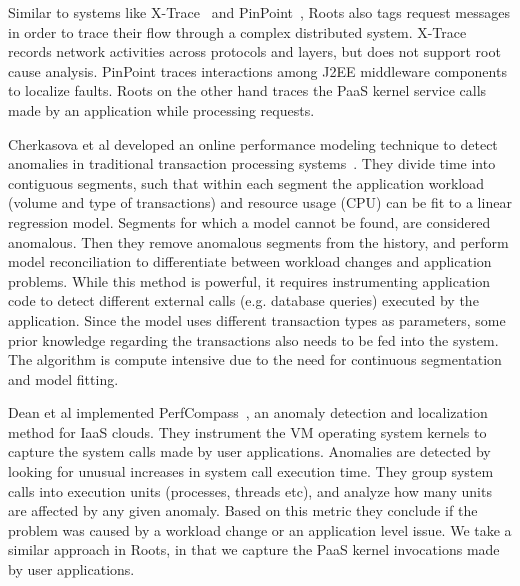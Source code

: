 Similar to systems like X-Trace~\cite{Fonseca:2007:XPN:1973430.1973450} and 
PinPoint~\cite{Chen:2002:PPD:647883.738238}, Roots also tags request messages in
order to trace their flow through a complex distributed system.
X-Trace records network activities across protocols and layers, but
does not support root cause analysis. PinPoint traces
interactions among J2EE middleware components to localize faults. Roots on the other
hand traces the PaaS kernel service calls made by an application while
processing requests.

Cherkasova et al developed an online
performance modeling technique to detect anomalies in traditional transaction processing systems~\cite{4630116}. 
They divide time into contiguous segments, such that within each
segment the application workload (volume and type of transactions) and resource usage (CPU) can be 
fit to a linear regression model.
Segments for which a model cannot be found, are considered anomalous. Then they remove anomalous segments
from the history, and perform model reconciliation to differentiate between workload changes and application problems. 
While this method is powerful, it
requires instrumenting application code to detect different external calls (e.g. database queries) executed by the application. 
Since the model uses different transaction types as parameters, 
some prior knowledge regarding the transactions also needs to be fed into the system. 
The algorithm is compute intensive due to the need for continuous segmentation and model fitting.

Dean et al implemented PerfCompass~\cite{Dean:2014:PTR:2696535.2696551}, 
an anomaly detection and localization method for IaaS clouds. They instrument
the VM operating system kernels to capture the system calls made by user applications. Anomalies are detected by
looking for unusual increases in system call execution time. They group system calls into execution units
(processes, threads etc), and analyze how many units are affected by any given anomaly. 
Based on this metric they conclude if the problem was caused by a workload change or an application
level issue. We take a similar approach in Roots, in that we capture the PaaS kernel invocations
made by user applications. 

